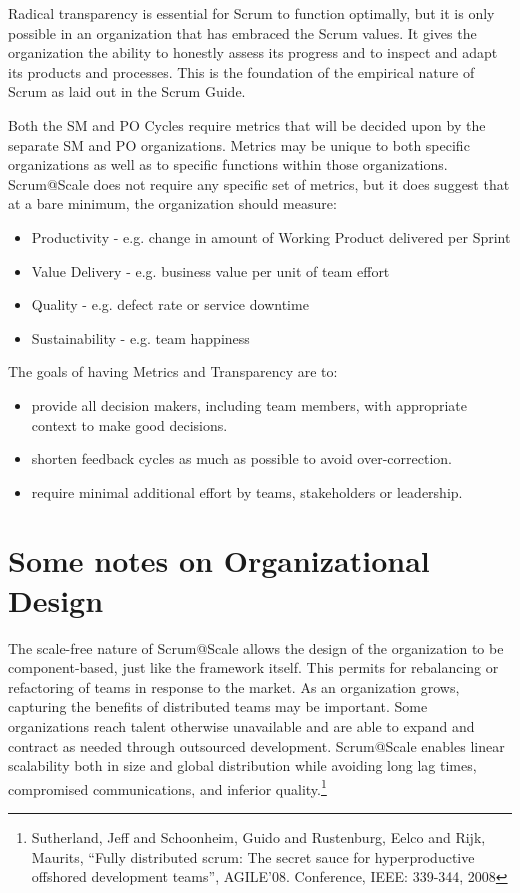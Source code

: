 \documentclass[12pt,a4paper,parskip=full]{scrartcl}
\begin{document}
Radical transparency is essential for Scrum to function optimally, but it is only possible in an organization that has embraced the Scrum values. It gives the organization the ability to honestly assess its progress and to inspect and adapt its products and processes. This is the foundation of the empirical nature of Scrum as laid out in the Scrum Guide.

Both the SM and PO Cycles require metrics that will be decided upon by the separate SM and PO organizations. Metrics may be unique to both specific organizations as well as to specific functions within those organizations. Scrum@Scale does not require any specific set of metrics, but it does suggest that at a bare minimum, the organization should measure:

\begin{itemize}
	\item Productivity - e.g. change in amount of Working Product delivered per Sprint
	\item Value Delivery - e.g. business value per unit of team effort
	\item Quality - e.g. defect rate or service downtime
	\item Sustainability - e.g. team happiness
\end{itemize}

The goals of having Metrics and Transparency are to:

\begin{itemize}
	\item provide all decision makers, including team members, with appropriate context to make good decisions.
	\item shorten feedback cycles as much as possible to avoid over-correction.
	\item require minimal additional effort by teams, stakeholders or leadership.
\end{itemize}

\section{Some notes on Organizational Design}

The scale-free nature of Scrum@Scale allows the design of the organization to be component-based, just like the framework itself. This permits for rebalancing or refactoring of teams in response to the market. As an organization grows, capturing the benefits of distributed teams may be important. Some organizations reach talent otherwise unavailable and are able to expand and contract as needed through outsourced development. Scrum@Scale enables linear scalability both in size and global distribution while avoiding long lag times, compromised communications, and inferior quality.\footnote{Sutherland, Jeff and Schoonheim, Guido and Rustenburg, Eelco and Rijk, Maurits, ``Fully distributed scrum: The secret sauce for hyperproductive offshored development teams'', AGILE'08. Conference, IEEE: 339-344, 2008}
\end{document}
